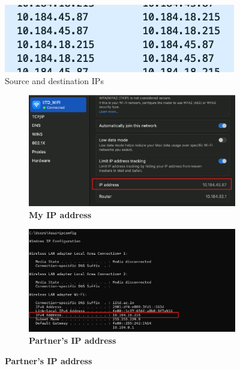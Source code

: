 \documentclass{article}
\begin{document}
    \begin{figure}[H]
    \centering
    \includegraphics[width=0.9\textwidth]{direct_connection.png}
    \caption*{Source and destination IPs}
    \end{figure}

\begin{figure}[H]
    \centering
    \begin{subfigure}[b]{0.465\textwidth}
        \centering
        \includegraphics[width=\textwidth]{yash_ip.png}
        \caption*{\textbf{My IP address}}
    \end{subfigure}
    \hfill
    \begin{subfigure}[b]{0.50\textwidth}
        \centering
        \includegraphics[width=\textwidth]{nikhil_ip.png}
        \caption*{\textbf{Partner's IP address}}
    \end{subfigure}
\end{figure}
\end{document}
